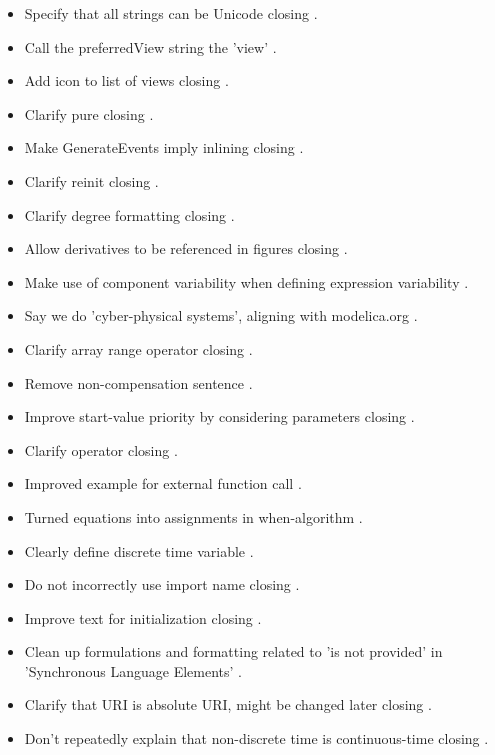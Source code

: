 \begin{itemize}
\item Specify that all strings can be Unicode  closing .
\item Call the preferredView string the 'view' .
\item Add icon to list of views  closing .
\item Clarify pure  closing .
\item Make GenerateEvents imply inlining  closing .
\item Clarify reinit  closing .
\item Clarify degree formatting  closing .
\item Allow derivatives to be referenced in figures  closing .
\item Make use of component variability when defining expression variability .
\item Say we do 'cyber-physical systems', aligning with modelica.org .
\item Clarify array range operator  closing .
\item Remove non-compensation sentence .
\item Improve start-value priority by considering parameters  closing .
\item Clarify operator  closing .
\item Improved example for external function call .
\item Turned equations into assignments in when-algorithm .
\item Clearly define discrete time variable .
\item Do not incorrectly use import name  closing .
\item Improve text for initialization  closing .
\item Clean up formulations and formatting related to 'is not provided' in 'Synchronous Language Elements' .
\item Clarify that URI is absolute URI, might be changed later  closing .
\item Don't repeatedly explain that non-discrete time is continuous-time  closing .

\end{itemize}

